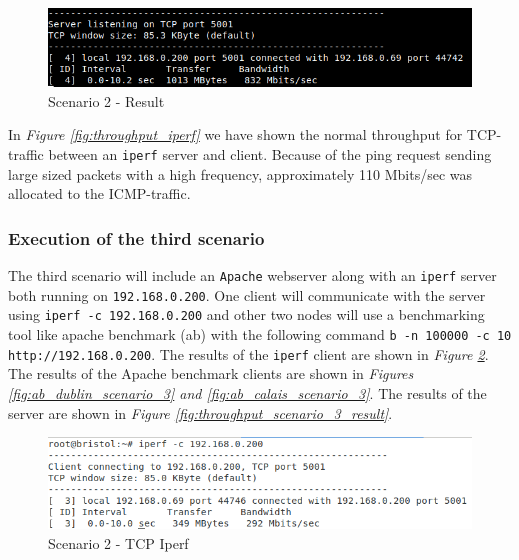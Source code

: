\documentclass{article}
\begin{document}
\begin{figure}[H]
\includegraphics[width=14cm]{figures/q2-2-2-result.png}
\centering
\caption{Scenario 2 - Result}
\centering
\label{fig:throughput_scenario_2_result}
\end{figure}

In \textit{Figure \ref{fig:throughput_iperf}} we have shown the normal throughput for TCP-traffic between an \texttt{iperf} server and client. Because of the ping request sending large sized packets with a high frequency, approximately 110 Mbits/sec was allocated to the ICMP-traffic.


\subsubsection{Execution of the third scenario}
The third scenario will include an \texttt{Apache} webserver along with an \texttt{iperf} server both running on \texttt{192.168.0.200}. One client will communicate with the server using \texttt{iperf -c 192.168.0.200} and other two nodes will use a benchmarking tool like apache benchmark (ab) with the following command \texttt{b -n 100000 -c 10 http://192.168.0.200}. The results of the \texttt{iperf} client are shown in \textit{Figure \ref{fig:throughput_scenario_3}}. The results of the Apache benchmark clients are shown in \textit{Figures \ref{fig:ab_dublin_scenario_3} and \ref{fig:ab_calais_scenario_3}}. The results of the server are shown in \textit{Figure \ref{fig:throughput_scenario_3_result}}.


\begin{figure}[H]
\includegraphics[width=14cm]{figures/q-2-2-3-1.png}
\centering
\caption{Scenario 2 - TCP Iperf}
\centering
\label{fig:throughput_scenario_3}
\end{figure}
\end{document}
